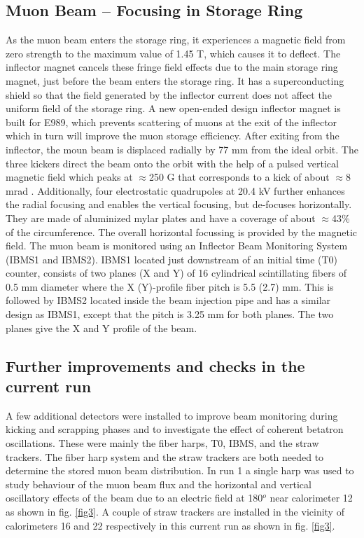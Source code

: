 \documentclass[journal,article,submit,moreauthors,pdftex,10pt,a4paper]{Definitions/mdpi}
\begin{document}
\subsection{Muon Beam – Focusing in Storage Ring}
As the muon beam enters the storage ring, it experiences a magnetic field from zero strength 
to the maximum value of 1.45 T, which causes it to deflect. 
The inflector magnet cancels these fringe field effects due to the main storage ring magnet, 
just before the beam enters the storage ring. It has a superconducting shield so that the
field generated by the inflector current does not affect the uniform field of the storage ring. 
A new open-ended design inflector magnet is built for E989, which prevents scattering of muons 
at the exit of the inflector which in turn will improve the muon storage efficiency.
After exiting from the inflector, the moun beam is displaced radially by 77 mm from the 
ideal orbit.  
The three kickers direct the beam onto the orbit with the help of a pulsed vertical 
magnetic field which peaks at $\approx$250 G that corresponds to a kick of about $\approx$8 mrad 
\cite{TDR}. Additionally, four electrostatic quadrupoles at 20.4 kV further enhances the radial 
focusing and enables the vertical focusing, but de-focuses horizontally. 
They are made of aluminized mylar plates and have a coverage of 
about $\approx$43\% of the circumference. The overall 
horizontal focussing is provided by the magnetic field. 
The muon beam is monitored using an Inflector Beam Monitoring System (IBMS1 and IBMS2). 
IBMS1 located just downstream of an initial time (T0) counter, consists of two planes (X and Y) of
16 cylindrical scintillating fibers of 0.5 mm diameter where the X (Y)-profile fiber pitch is 5.5 (2.7) mm. 
This is followed by IBMS2 located inside the beam injection pipe and has a similar design as IBMS1, 
except that the pitch is 3.25 mm for both planes. The two planes give the X and Y profile of the beam. 
\cite{docdb}   
\subsection{Further improvements and checks in the current run}
A few additional detectors were installed to improve beam monitoring during kicking and 
scrapping phases and to investigate the effect of coherent betatron oscillations. 
These were mainly the fiber harps, T0, IBMS, and the straw trackers. 
The fiber harp system and the straw trackers are both needed to determine
the stored muon beam distribution. %
In run 1 a single harp was used to study behaviour of the muon beam flux and the
horizontal and vertical oscillatory effects of the beam due
to an electric field at 180$^o$ near calorimeter 12 as shown in fig. \ref{fig3}.
A couple of straw trackers are installed in the 
vicinity of calorimeters 16 and 22 respectively in this current run as shown in fig. \ref{fig3}. 
\end{document}
